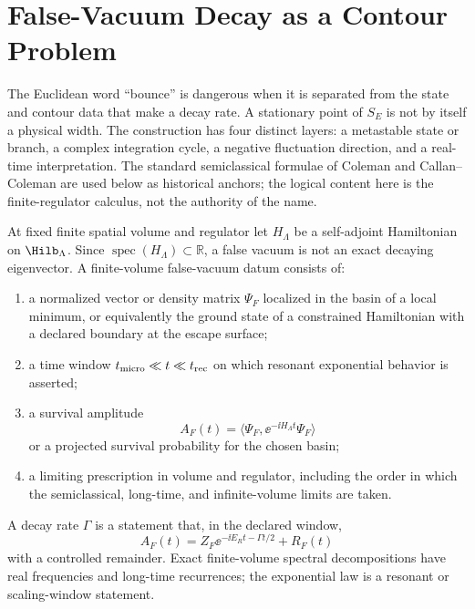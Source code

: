 \section{False-Vacuum Decay as a Contour Problem}
\label{sec:false-vacuum-decay-contour-problem}

The Euclidean word ``bounce'' is dangerous when it is separated from the
state and contour data that make a decay rate.  A stationary point of
\(S_E\) is not by itself a physical width.  The construction has four
distinct layers: a metastable state or branch, a complex integration cycle, a
negative fluctuation direction, and a real-time interpretation.  The standard
semiclassical formulae of Coleman and Callan--Coleman
\cite{Coleman1977FalseVacuum,CallanColeman1977Fate} are used below as
historical anchors; the logical content here is the finite-regulator
calculus, not the authority of the name.

\begin{definition}
\label{def:finite-volume-false-vacuum-datum}
At fixed finite spatial volume and regulator let \(H_\Lambda\) be a
self-adjoint Hamiltonian on \(\Hilb_\Lambda\).  Since
\(\operatorname{spec}(H_\Lambda)\subset\mathbb R\), a false vacuum is not an
exact decaying eigenvector.  A finite-volume false-vacuum datum consists of:
\begin{enumerate}
\item a normalized vector or density matrix \(\Psi_F\) localized in the basin
      of a local minimum, or equivalently the ground state of a constrained
      Hamiltonian with a declared boundary at the escape surface;
\item a time window \(t_{\rm micro}\ll t\ll t_{\rm rec}\) on which resonant
      exponential behavior is asserted;
\item a survival amplitude
      \begin{equation}
        A_F(t)=\langle\Psi_F,\ee^{-\ii H_\Lambda t}\Psi_F\rangle
        \label{eq:false-vacuum-survival-amplitude}
      \end{equation}
      or a projected survival probability for the chosen basin;
\item a limiting prescription in volume and regulator, including the order in
      which the semiclassical, long-time, and infinite-volume limits are
      taken.
\end{enumerate}
A decay rate \(\Gamma\) is a statement that, in the declared window,
\[
  A_F(t)=Z_F\ee^{-\ii E_R t-\Gamma t/2}+R_F(t)
\]
with a controlled remainder.  Exact finite-volume spectral decompositions have
real frequencies and long-time recurrences; the exponential law is a resonant
or scaling-window statement.
\end{definition}

